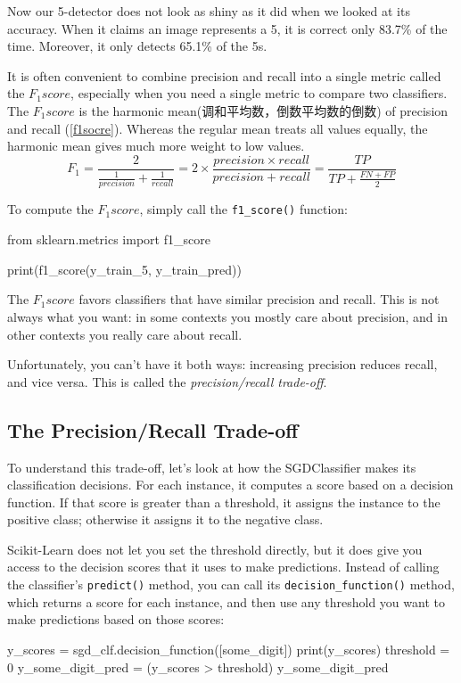 Now our 5-detector does not look as shiny as it did when we looked at its accuracy. When it claims an image represents a 5, it is correct only 83.7\% of the time. Moreover, it only detects 65.1\% of the 5s.

It is often convenient to combine precision and recall into a single metric called the $F_1 score$, especially when you need a single metric to compare two classifiers. The $F_1 score$ is the harmonic mean(调和平均数，倒数平均数的倒数) of precision and recall (\autoref{f1socre}). Whereas the regular mean treats all values equally, the harmonic mean gives much more weight to low values.
\begin{equation}\label{f1socre}
    F_1 =\frac{2}{\frac{1}{precision} + \frac{1}{ recall}} = 2 \times \frac{precision \times recall}{precision + recall}=\frac{TP}{TP+\frac{FN+FP}{2}}
\end{equation}

To compute the $F_1 score$, simply call the \verb|f1_score()| function:
\begin{pyc}
    from sklearn.metrics import f1_score

    print(f1_score(y_train_5, y_train_pred))
\end{pyc}

The $F_1 score$ favors classifiers that have similar precision and recall. This is not always what you want: in some contexts you mostly care about precision, and in other contexts you really care about recall.

Unfortunately, you can't have it both ways: increasing precision reduces recall, and vice versa. This is called the \emph{precision/recall trade-off}.

\subsection{The Precision/Recall Trade-off}

To understand this trade-off, let's look at how the SGDClassifier makes its classification decisions. For each instance, it computes a score based on a decision function. If that score is greater than a threshold, it assigns the instance to the positive class; otherwise it assigns it to the negative class.

Scikit-Learn does not let you set the threshold directly, but it does give you access to the decision scores that it uses to make predictions. Instead of calling the classifier's \verb|predict()| method, you can call its \verb|decision_function()| method, which returns a score for each instance, and then use any threshold you want to make predictions based on those scores:
\begin{pyc}
    y_scores = sgd_clf.decision_function([some_digit])
    print(y_scores)
    threshold = 0
    y_some_digit_pred = (y_scores > threshold)
    y_some_digit_pred
\end{pyc}

